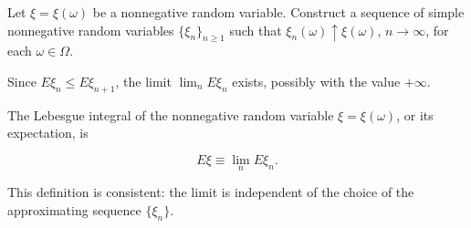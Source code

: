 Let $\xi = \xi(\omega)$ be a nonnegative random variable. Construct a sequence of simple nonnegative random variables $\{\xi_n\}_{n \geq 1}$ such that $\xi_n(\omega) \uparrow \xi(\omega)$, $n \to \infty$, for each $\omega \in \Omega$.

Since $E\xi_n \leq E\xi_{n+1}$, the limit $\lim_n E\xi_n$ exists, possibly with the value $+\infty$.

The Lebesgue integral of the nonnegative random variable $\xi = \xi(\omega)$, or its expectation, is

$$E\xi \equiv \lim_n E\xi_n.$$

This definition is consistent: the limit is independent of the choice of the approximating sequence $\{\xi_n\}$.
